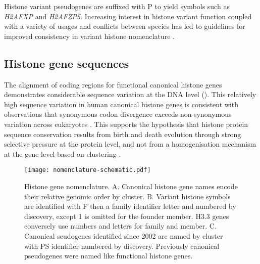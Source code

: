 	Histone variant pseudogenes are suffixed with P to yield symbols such as \textit{H2AFXP} and \textit{H2AFZP5}.
	Increasing interest in histone variant function 
	coupled with a variety of usages and conflicts between species 
	has led to guidelines for improved consistency in variant histone nomenclature .

  \subsection{Histone gene sequences}

	The alignment of coding regions for functional canonical histone genes 
	demonstrates considerable sequence variation at the DNA level (). 
	This relatively high sequence variation in human canonical histone genes 
	is consistent with observations that 
	synonymous codon divergence exceeds non-synonymous variation across eukaryotes  . 
	This supports the hypothesis that histone protein sequence conservation 
	results from birth and death evolution through strong selective pressure at the protein level, 
	and not from a homogenisation mechanism at the gene level based on clustering .

    \begin{figure*}
      \centering
      \texttt{[image: nomenclature-schematic.pdf]}
      \caption{Histone gene nomenclature. 
	  A. Canonical histone gene names encode their relative genomic order by cluster. 
	  B. Variant histone symbols are identified with F then a family identifier letter
	  and numbered by discovery, except 1 is omitted for the founder member.
	  H3.3 genes conversely use numbers and letters for family and member.
	  C. Canonical seudogenes identified since 2002 are named by cluster with PS identifier numbered by discovery. 
	  Previously canonical pseudogenes were named like functional histone genes.}
      \label{fig:nomenclature}
    \end{figure*}

